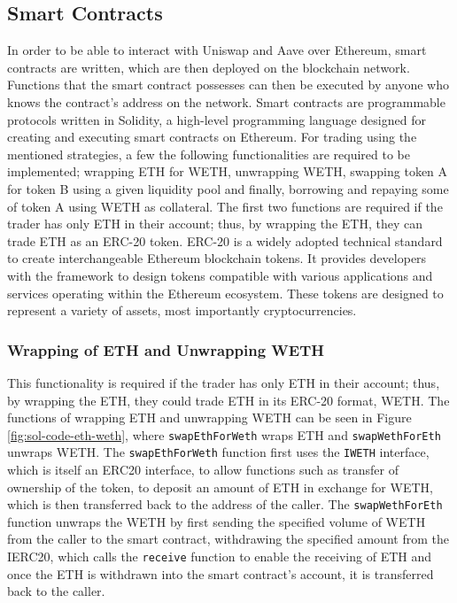 \subsection{Smart Contracts}
\label{sec:smart-contracts}
In order to be able to interact with Uniswap and Aave over Ethereum, smart contracts are written, which are then deployed on the blockchain network. Functions that the smart contract possesses can then be executed by anyone who knows the contract's address on the network. Smart contracts are programmable protocols written in Solidity, a high-level programming language designed for creating and executing smart contracts on Ethereum. For trading using the mentioned strategies, a few the following functionalities are required to be implemented; wrapping ETH for WETH, unwrapping WETH, swapping token A for token B using a given liquidity pool and finally, borrowing and repaying some of token A using WETH as collateral. The first two functions are required if the trader has only ETH in their account; thus, by wrapping the ETH, they can trade ETH as an ERC-20 token. ERC-20 is a widely adopted technical standard to create interchangeable Ethereum blockchain tokens. It provides developers with the framework to design tokens compatible with various applications and services operating within the Ethereum ecosystem. These tokens are designed to represent a variety of assets, most importantly cryptocurrencies.

\subsubsection{Wrapping of ETH and Unwrapping WETH}
This functionality is required if the trader has only ETH in their account; thus, by wrapping the ETH, they could trade ETH in its ERC-20 format, WETH. The functions of wrapping ETH and unwrapping WETH can be seen in Figure \ref{fig:sol-code-eth-weth}, where \texttt{swapEthForWeth} wraps ETH and \texttt{swapWethForEth} unwraps WETH. The \texttt{swapEthForWeth} function first uses the \texttt{IWETH} interface, which is itself an ERC20 interface, to allow functions such as transfer of ownership of the token, to deposit an amount of ETH in exchange for WETH, which is then transferred back to the address of the caller. The \texttt{swapWethForEth} function unwraps the WETH by first sending the specified volume of WETH from the caller to the smart contract, withdrawing the specified amount from the IERC20, which calls the \texttt{receive} function to enable the receiving of ETH and once the ETH is withdrawn into the smart contract's account, it is transferred back to the caller.

